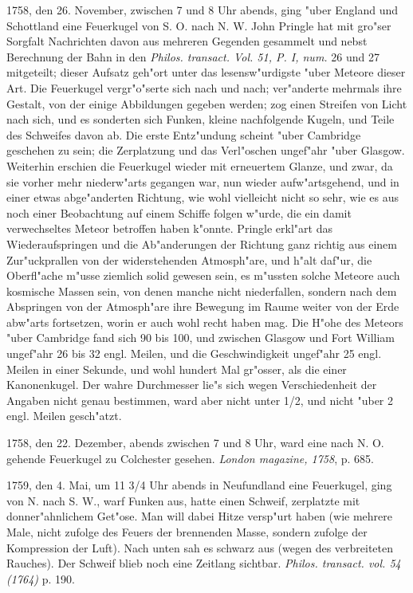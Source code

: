 \documentclass[a4paper, 11pt, oneside, polutonikogreek, german]{article}
\begin{document}
1758, den 26. November, zwischen 7 und 8 Uhr abends, ging "uber England und Schottland eine Feuerkugel von S. O. nach N. W. John Pringle hat mit gro"ser Sorgfalt Nachrichten davon aus mehreren Gegenden gesammelt und nebst Berechnung der Bahn in den \emph{Philos. transact. Vol. 51, P. I, num.} 26 und 27 mitgeteilt; dieser Aufsatz geh"ort unter das lesensw"urdigste "uber Meteore dieser Art. Die Feuerkugel vergr"o"serte sich nach und nach; ver"anderte mehrmals ihre Gestalt, von der einige Abbildungen gegeben werden; zog einen Streifen von Licht nach sich, und es sonderten sich Funken, kleine nachfolgende Kugeln, und Teile des Schweifes davon ab. Die erste Entz"undung scheint "uber Cambridge geschehen zu sein; die Zerplatzung und das Verl"oschen ungef"ahr "uber Glasgow. Weiterhin erschien die Feuerkugel wieder mit erneuertem Glanze, und zwar, da sie vorher mehr niederw"arts gegangen war, nun wieder aufw"artsgehend, und in einer etwas abge"anderten Richtung, wie wohl vielleicht nicht so sehr, wie es aus noch einer Beobachtung auf einem Schiffe folgen w"urde, die ein damit verwechseltes Meteor betroffen haben k"onnte. Pringle erkl"art das Wiederaufspringen und die Ab"anderungen der Richtung ganz richtig aus einem Zur"uckprallen von der widerstehenden Atmosph"are, und h"alt daf"ur, die Oberfl"ache m"usse ziemlich solid gewesen sein, es m"ussten solche Meteore auch kosmische Massen sein, von denen manche nicht niederfallen, sondern nach dem Abspringen von der Atmosph"are ihre Bewegung im Raume weiter von der Erde abw"arts fortsetzen, worin er auch wohl recht haben mag. Die H"ohe des Meteors "uber Cambridge fand sich 90 bis 100, und zwischen Glasgow und Fort William ungef"ahr 26 bis 32 engl. Meilen, und die Geschwindigkeit ungef"ahr 25 engl. Meilen in einer Sekunde, und wohl hundert Mal gr"osser, als die einer Kanonenkugel. Der wahre Durchmesser lie"s sich wegen Verschiedenheit der Angaben nicht genau bestimmen, ward aber nicht unter 1/2, und nicht "uber 2 engl. Meilen gesch"atzt.

1758, den 22. Dezember, abends zwischen 7 und 8 Uhr, ward eine nach N. O. gehende Feuerkugel zu Colchester gesehen. \emph{London magazine, 1758}, p. 685.

1759, den 4. Mai, um 11 3/4 Uhr abends in Neufundland eine Feuerkugel, ging von N. nach S. W., warf Funken aus, hatte einen Schweif, zerplatzte mit donner"ahnlichem Get"ose. Man will dabei Hitze versp"urt haben (wie mehrere Male, nicht zufolge des Feuers der brennenden Masse, sondern zufolge der Kompression der Luft). Nach unten sah es schwarz aus (wegen des verbreiteten Rauches). Der Schweif blieb noch eine Zeitlang sichtbar. \emph{Philos. transact. vol. 54 (1764)} p. 190.
\end{document}
